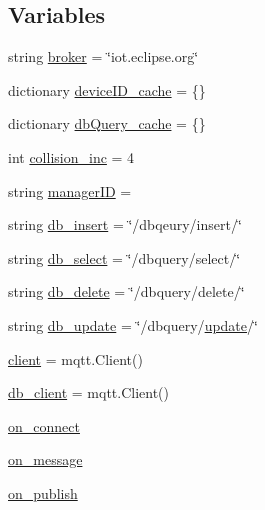 \subsection*{Variables}
\begin{DoxyCompactItemize}
\item 
string \hyperlink{namespaceflexIDMnger_a7921a1547a604812b8598511ec7510b1}{broker} = \char`\"{}iot.\+eclipse.\+org\char`\"{}
\item 
dictionary \hyperlink{namespaceflexIDMnger_a410887fb1e5741855597352a40e77a16}{device\+I\+D\+\_\+cache} = \{\}
\item 
dictionary \hyperlink{namespaceflexIDMnger_a5cbd9153a4dcde4ba9c238730f139570}{db\+Query\+\_\+cache} = \{\}
\item 
int \hyperlink{namespaceflexIDMnger_a5f94c1426e81cb817d657b1ae5837d8c}{collision\+\_\+inc} = 4
\item 
string \hyperlink{namespaceflexIDMnger_a9dab00781c88df93251321044fd86d63}{manager\+ID} = \textquotesingle{}\textquotesingle{}
\item 
string \hyperlink{namespaceflexIDMnger_a1981fc00829b540f8d58471de23e3acd}{db\+\_\+insert} = \char`\"{}/dbqeury/insert/\char`\"{}
\item 
string \hyperlink{namespaceflexIDMnger_a423e288f8377fcad63137ba3798070e3}{db\+\_\+select} = \char`\"{}/dbquery/select/\char`\"{}
\item 
string \hyperlink{namespaceflexIDMnger_a386574d9419f6dfafb0b9110c8523bbd}{db\+\_\+delete} = \char`\"{}/dbquery/delete/\char`\"{}
\item 
string \hyperlink{namespaceflexIDMnger_a3cc825d50191d10077c31adec3a44cbe}{db\+\_\+update} = \char`\"{}/dbquery/\hyperlink{namespaceflexIDMnger_aba39b4b12e83409d89e6557292a69101}{update}/\char`\"{}
\item 
\hyperlink{namespaceflexIDMnger_a14d9378e3d8a87b7ff6a7dad2fd1b6c6}{client} = mqtt.\+Client()
\item 
\hyperlink{namespaceflexIDMnger_a6e31c5c83adf5a1635c60ecbc0eb7dd6}{db\+\_\+client} = mqtt.\+Client()
\item 
\hyperlink{namespaceflexIDMnger_aab705630161ba445dfd16818fee4fa7a}{on\+\_\+connect}
\item 
\hyperlink{namespaceflexIDMnger_aebb6d039352acac6b65f782692fec334}{on\+\_\+message}
\item 
\hyperlink{namespaceflexIDMnger_ad0afbb619c7964838188ee89009f7957}{on\+\_\+publish}
\end{DoxyCompactItemize}


